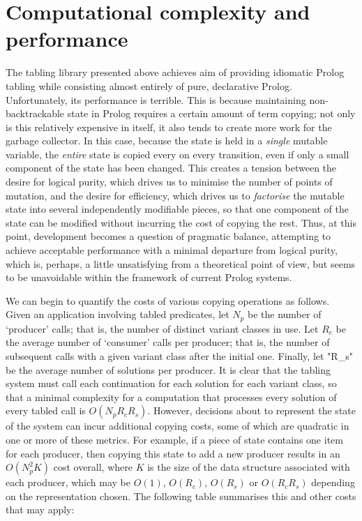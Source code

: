 \section{Computational complexity and performance}

The tabling library presented above achieves aim of providing
idiomatic Prolog tabling while consisting almost entirely of pure, declarative Prolog.
Unfortunately, its performance is terrible. This is because maintaining non-backtrackable
state in Prolog requires a certain amount of term copying; not only is this relatively
expensive in itself, it also tends to create more work for the garbage collector. In this case,
because the state is held in a \emph{single} mutable variable, the \emph{entire} state is
copied every on every transition, even if only a small component of the
state has been changed. This creates a tension between the desire for logical purity,
which drives us to minimise the number of points of mutation, and the desire for
efficiency, which drives us to \emph{factorise} the mutable state into several
independently modifiable pieces, so that one component of the state can be modified without
incurring the cost of copying the rest. Thus, at this point, development becomes a 
question of pragmatic balance, attempting to achieve acceptable performance with
a minimal departure from logical purity, which is, perhaps, a little unsatisfying from a 
theoretical point of view, but seems to be unavoidable within the framework
of current Prolog systems. 

We can begin to quantify the costs of various copying operations as follows.
Given an application involving tabled predicates, let $N_p$ be the number
of `producer' calls; that is, the number of distinct variant classes in use.
Let $R_c$ be the average number of `consumer' calls per producer; that is, the
number of subsequent calls with a given variant class after the initial
one. Finally, let "R_s" be the average number of solutions per producer.
It is clear that the tabling system must call each continuation for each solution
for each variant class, so that a minimal complexity for a computation that
processes every solution of every tabled call is $O(N_p R_c R_s)$. However,
decisions about to represent the state of the system can incur additional copying costs,
some of which are quadratic in one or more of these metrics. For example, if a piece of
state contains one item for each producer, then copying this state to add a new
producer results in an $O(N_p^2 K)$ cost overall, where $K$ is the size
of the data structure associated with each producer, which may be $O(1)$, $O(R_c)$,
$O(R_s)$ or $O(R_c R_s)$ depending on the representation chosen.
The following table summarises this and other costs that may apply:

